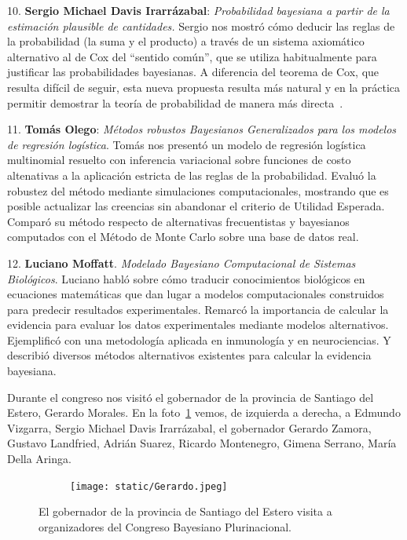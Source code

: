 \documentclass[a4paper,11pt]{book}
\theoremstyle{definition}
\begin{document}
\hspace{0.6cm} 10. \textbf{Sergio Michael Davis Irarrázabal}: \emph{Probabilidad bayesiana a partir de la estimación plausible de cantidades.}
%
Sergio nos mostró cómo deducir las reglas de la probabilidad (la suma y el producto) a través de un sistema axiomático alternativo al de Cox del ``sentido común'', que se utiliza habitualmente para justificar las probabilidades bayesianas.
%
A diferencia del teorema de Cox, que resulta difícil de seguir, esta nueva propuesta resulta más natural y en la práctica permitir demostrar la teoría de probabilidad de manera más directa~\cite{DavisLibro}.

\hspace{0.6cm} 11. \textbf{Tomás Olego}: \emph{Métodos robustos Bayesianos Generalizados para los modelos de regresión logística}.
%
Tomás nos presentó un modelo de regresión logística multinomial resuelto con inferencia variacional sobre funciones de costo altenativas a la aplicación estricta de las reglas de la probabilidad.
%
Evaluó la robustez del método mediante simulaciones computacionales, mostrando que es posible actualizar las creencias sin abandonar el criterio de Utilidad Esperada.
%
Comparó su método respecto de alternativas frecuentistas y bayesianos computados con el Método de Monte Carlo sobre una base de datos real.


\hspace{0.6cm} 12. \textbf{Luciano Moffatt}. \emph{Modelado Bayesiano  Computacional de Sistemas Biológicos}.
%
Luciano habló sobre cómo traducir conocimientos biológicos en ecuaciones matemáticas que dan lugar a modelos computacionales construidos para predecir resultados experimentales.
%
Remarcó la importancia de calcular la evidencia para evaluar los datos experimentales mediante modelos alternativos.
%
Ejemplificó con una metodología aplicada en inmunología y en neurociencias.
%
Y describió diversos métodos alternativos existentes para calcular la evidencia bayesiana.


Durante el congreso nos visitó el gobernador de la provincia de Santiago del Estero, Gerardo Morales.
%
En la foto~\ref{fig:gerardo} vemos, de izquierda a derecha, a Edmundo Vizgarra, Sergio Michael Davis Irarrázabal, el gobernador Gerardo Zamora, Gustavo Landfried, Adrián Suarez, Ricardo Montenegro, Gimena Serrano, María Della Aringa.
%
\begin{figure}[!h]
\centering
  \begin{subfigure}[b]{0.8\textwidth}
  \texttt{[image: static/Gerardo.jpeg]}
  \end{subfigure}
  \caption{El gobernador de la provincia de Santiago del Estero visita a organizadores del Congreso Bayesiano Plurinacional.}
  \label{fig:gerardo}
\end{figure}
\end{document}
